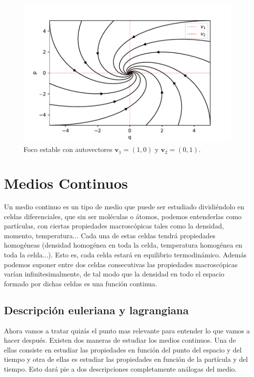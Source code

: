 \documentclass[12pt,a4paper]{article}
\numberwithin{equation}{section}
\numberwithin{figure}{section}
\newcommand{\vn}{\mathbf{v}}
\begin{document}
\begin{figure}[h!] \centering
\includegraphics[scale=0.9]{nodo-estable.pdf}
\caption{Foco estable con autovectores $\vn_1=(1,0)$ y $\vn_2 = (0,1)$.}
\label{Fig:07-nodo-inestable}
\end{figure}


\newpage

\section{Medios Continuos}

Un medio continuo es un tipo de medio que puede ser estudiado dividiéndolo en celdas diferenciales, que sin ser moléculas o átomos, podemos entenderlas como partículas, con ciertas propiedades macroscópicas tales como la densidad, momento, temperatura... Cada una de estas celdas tendrá propiedades homogéneas (densidad homogénea en toda la celda, temperatura homogénea en toda la celda...). Esto es, cada celda estará en equilibrio termodinámico. Además podemos suponer entre dos celdas consecutivas las propiedades macroscópicas varían infinitesimalmente, de tal modo que la densidad en todo el espacio formado por dichas celdas es una función continua. \\


\subsection{Descripción euleriana y lagrangiana}

Ahora vamos a tratar quizás el punto mas relevante para entender lo que vamos a hacer después. Existen dos maneras de estudiar los medios continuos. Una de ellas consiste en estudiar las propiedades en función del punto del espacio y del tiempo y otra de ellas es estudiar las propiedades en función de la partícula y del tiempo. Esto dará pie a dos descripciones completamente análogas del medio. \\
\end{document}
